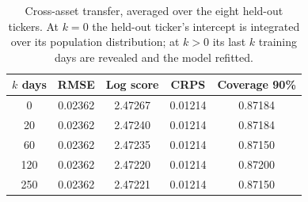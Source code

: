 \begin{table}[htbp]
\centering
\caption{Cross-asset transfer, averaged over the eight held-out tickers. At $k=0$ the held-out ticker's intercept is integrated over its population distribution; at $k>0$ its last $k$ training days are revealed and the model refitted.}
\label{tab:transfer}
\begin{tabular}{S[table-format=3.0] S[table-format=1.5] S[table-format=1.5] S[table-format=1.5] S[table-format=1.5]}
\toprule
{$k$ days} & {RMSE} & {Log score} & {CRPS} & {Coverage 90\%} \\
 & 0.02362 & 2.47267 & 0.01214 & 0.87184 \\
20 & 0.02362 & 2.47240 & 0.01214 & 0.87184 \\
60 & 0.02362 & 2.47235 & 0.01214 & 0.87150 \\
120 & 0.02362 & 2.47220 & 0.01214 & 0.87200 \\
250 & 0.02362 & 2.47221 & 0.01214 & 0.87150 \\
\bottomrule
\end{tabular}
\end{table}